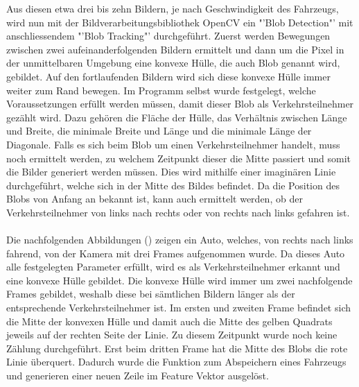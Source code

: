 Aus diesen etwa drei bis zehn Bildern, je nach Geschwindigkeit des Fahrzeugs, wird nun mit der Bildverarbeitungsbibliothek OpenCV ein "'Blob Detection"' mit anschliessendem "'Blob Tracking"' durchgeführt. Zuerst werden Bewegungen zwischen zwei aufeinanderfolgenden Bildern ermittelt und dann um die Pixel in der unmittelbaren Umgebung eine konvexe Hülle, die auch Blob genannt wird, gebildet. Auf den fortlaufenden Bildern wird sich diese konvexe Hülle immer weiter zum Rand bewegen. Im Programm selbst wurde festgelegt, welche Voraussetzungen erfüllt werden müssen, damit dieser Blob als Verkehrsteilnehmer gezählt wird. Dazu gehören die Fläche der Hülle, das Verhältnis zwischen Länge und Breite, die minimale Breite und Länge und die minimale Länge der Diagonale. Falls es sich beim Blob um einen Verkehrsteilnehmer handelt, muss noch ermittelt werden, zu welchem Zeitpunkt dieser die Mitte passiert und somit die Bilder generiert werden müssen. Dies wird mithilfe einer imaginären Linie durchgeführt, welche sich in der Mitte des Bildes befindet. Da die Position des Blobs von Anfang an bekannt ist, kann auch ermittelt werden, ob der Verkehrsteilnehmer von links nach rechts oder von rechts nach links gefahren ist.\\\\
Die nachfolgenden Abbildungen () zeigen ein Auto, welches, von rechts nach links fahrend, von der Kamera mit drei Frames aufgenommen wurde. Da dieses Auto alle festgelegten Parameter erfüllt, wird es als Verkehrsteilnehmer erkannt und eine konvexe Hülle gebildet. Die konvexe Hülle wird immer um zwei nachfolgende Frames gebildet, weshalb diese bei sämtlichen Bildern länger als der entsprechende Verkehrsteilnehmer ist. Im ersten und zweiten Frame befindet sich die Mitte der konvexen Hülle und damit auch die Mitte des gelben Quadrats jeweils auf der rechten Seite der Linie. Zu diesem Zeitpunkt wurde noch keine Zählung durchgeführt. Erst beim dritten Frame hat die Mitte des Blobs die rote Linie überquert. Dadurch wurde die Funktion zum Abspeichern eines Fahrzeugs und generieren einer neuen Zeile im Feature Vektor ausgelöst.

